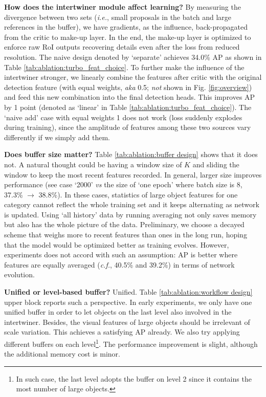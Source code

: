 \documentclass{article} \usepackage{iclr2019_conference,times}
\begin{document}
\textbf{How does the intertwiner module affect learning?} By measuring the  divergence between two sets (\textit{i.e.}, small proposals in the batch and large references in the buffer), we have gradients, as the influence, back-propagated from the critic to make-up layer. In the end, the make-up layer is optimized to enforce raw RoI outputs recovering details even after the loss from reduced resolution. 
The naive design denoted by `separate' achieves 34.0\% AP as shown in Table \ref{tab:ablation:turbo_feat_choice}. 
To further make the influence of the intertwiner stronger, we linearly combine the features after critic with the original detection feature (with equal weights, \textit{aka} 0.5; \textit{not} shown in Fig. \ref{fig:overview}) and feed this new combination into the final detection heads. This improves AP by 1 point (denoted as `linear' in Table \ref{tab:ablation:turbo_feat_choice}). The `naive add' case with equal weights 1 does not work (loss suddenly explodes during training), since the amplitude of features among these two sources vary differently if we simply add them.



\textbf{Does buffer size matter?} Table \ref{tab:ablation:buffer design} shows that it does not. A natural thought could be having a window size of $K$ and sliding the window to keep the most recent features recorded. In general, larger size improves performance (see case `2000' \textit{vs} the size of `one epoch' where batch size is 8, 37.3\% $\rightarrow$ 38.8\%). In these cases,  statistics of large object features for one category cannot reflect the whole training set and it keeps alternating as network is updated. 
Using `all history' data by running averaging not only saves memory  but also has the whole picture of the data. Preliminary, we choose a decayed scheme that weighs more to recent features than ones in the long run, hoping that the model would be optimized better as training evolves. However, experiments does not accord with such an assumption: AP is better where features are equally averaged (\textit{c.f.}, 40.5\% and 39.2\%) in terms of network evolution.


\textbf{Unified or level-based buffer?} Unified. Table \ref{tab:ablation:workflow design} upper block reports such a perspective. In early experiments, we only have one unified buffer in order to let objects on the last level also involved in the intertwiner. Besides, the visual features of large objects should be irrelevant of scale variation. This achieves a satisfying AP already. We also try applying different buffers on each level\footnote{In such case, the last level adopts the buffer on level 2 since it contains the most number of large objects.}. The performance improvement is slight, although the additional memory cost is minor.
\end{document}
